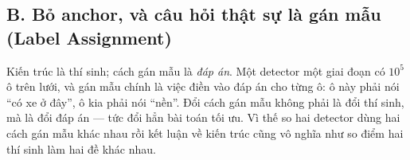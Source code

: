 \documentclass[../../../deep_learning.tex]{subfiles}
\begin{document}
\subsection{B. Bỏ anchor, và câu hỏi thật sự là gán mẫu (Label Assignment)}

\begin{trucgiac}
Kiến trúc là thí sinh; cách gán mẫu là \emph{đáp án}. Một detector một giai đoạn có \(10^5\) ô trên lưới, và gán mẫu chính là việc điền vào đáp án cho từng ô: ô này phải nói ``có xe ở đây'', ô kia phải nói ``nền''. Đổi cách gán mẫu không phải là đổi thí sinh, mà là đổi đáp án --- tức đổi hẳn bài toán tối ưu. Vì thế so hai detector dùng hai cách gán mẫu khác nhau rồi kết luận về kiến trúc cũng vô nghĩa như so điểm hai thí sinh làm hai đề khác nhau.
\end{trucgiac}
\end{document}
